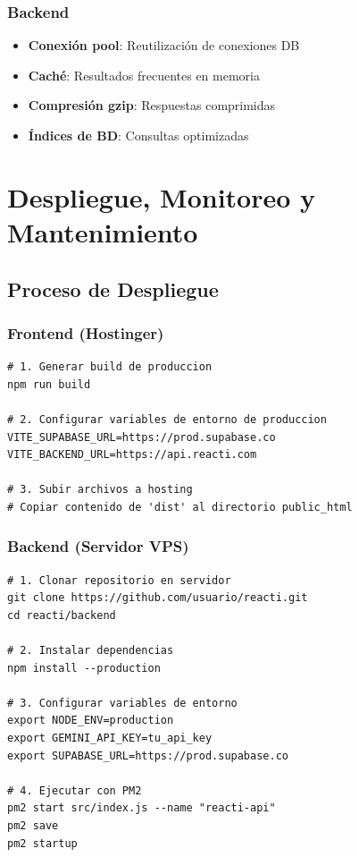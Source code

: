 \documentclass[12pt,a4paper]{report}
\begin{document}
\subsection{Backend}
\begin{itemize}
    \item \textbf{Conexión pool}: Reutilización de conexiones DB
    \item \textbf{Caché}: Resultados frecuentes en memoria
    \item \textbf{Compresión gzip}: Respuestas comprimidas
    \item \textbf{Índices de BD}: Consultas optimizadas
\end{itemize}

\chapter{Despliegue, Monitoreo y Mantenimiento}

\section{Proceso de Despliegue}

\subsection{Frontend (Hostinger)}
\begin{lstlisting}
# 1. Generar build de produccion
npm run build

# 2. Configurar variables de entorno de produccion
VITE_SUPABASE_URL=https://prod.supabase.co
VITE_BACKEND_URL=https://api.reacti.com

# 3. Subir archivos a hosting
# Copiar contenido de 'dist' al directorio public_html
\end{lstlisting}

\subsection{Backend (Servidor VPS)}
\begin{lstlisting}
# 1. Clonar repositorio en servidor
git clone https://github.com/usuario/reacti.git
cd reacti/backend

# 2. Instalar dependencias
npm install --production

# 3. Configurar variables de entorno
export NODE_ENV=production
export GEMINI_API_KEY=tu_api_key
export SUPABASE_URL=https://prod.supabase.co

# 4. Ejecutar con PM2
pm2 start src/index.js --name "reacti-api"
pm2 save
pm2 startup
\end{lstlisting}
\end{document}
